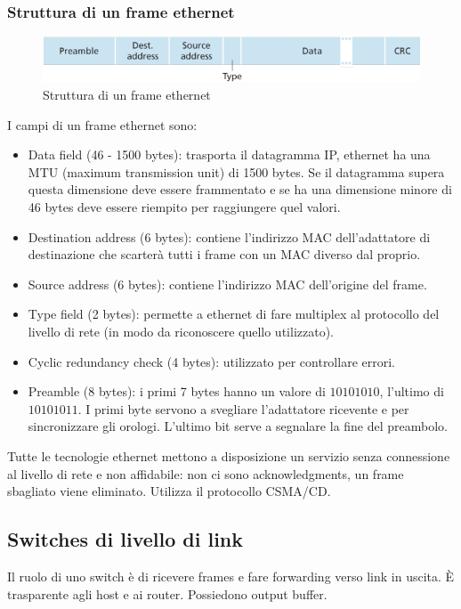 \subsubsection{Struttura di un frame ethernet}
\begin{figure}[h]
\includegraphics[width=\textwidth]{Pictures/EthernetFrame.png}
\caption{Struttura di un frame ethernet}
\end{figure}
I campi di un frame ethernet sono:
\begin{itemize}
\item Data field (46 - 1500 bytes): trasporta il datagramma IP, ethernet ha una MTU (maximum transmission unit) di 1500 bytes. Se il datagramma supera questa dimensione deve essere frammentato e se ha
una dimensione minore di 46 bytes deve essere riempito per raggiungere quel valori.
\item Destination address (6 bytes): contiene l'indirizzo MAC dell'adattatore di destinazione che scarter\`a tutti i frame con un MAC diverso dal proprio.
\item Source address (6 bytes): contiene l'indirizzo MAC dell'origine del frame.
\item Type field (2 bytes): permette a ethernet di fare multiplex al protocollo del livello di rete (in modo da riconoscere quello utilizzato).
\item Cyclic redundancy check (4 bytes): utilizzato per controllare errori.
\item Preamble (8 bytes): i primi 7 bytes hanno un valore di $10101010$, l'ultimo di $10101011$. I primi byte servono a svegliare l'adattatore ricevente e per sincronizzare gli orologi. L'ultimo bit serve a 
segnalare la fine del preambolo.
\end{itemize}
Tutte le tecnologie ethernet mettono a disposizione un servizio senza connessione al livello di rete e non affidabile: non ci sono acknowledgments, un frame sbagliato viene eliminato. Utilizza il protocollo 
CSMA/CD.
\subsection{Switches di livello di link}
Il ruolo di uno switch \`e di ricevere frames e fare forwarding verso link in uscita. \`E trasparente agli host e ai router. Possiedono output buffer.
